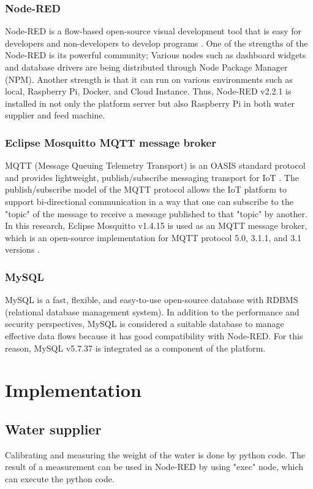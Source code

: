 ﻿\documentclass[conference]{IEEEtran}
\begin{document}
\subsubsection{Node-RED}
Node-RED is a flow-based open-source visual development tool that is easy for developers and non-developers to develop programs \cite{b12}.
One of the strengths of the Node-RED is its powerful community; Various nodes such as dashboard widgets and database drivers are being distributed through Node Package Manager (NPM).
Another strength is that it can run on various environments such as local, Raspberry Pi, Docker, and Cloud Instance.
Thus, Node-RED v2.2.1 is installed in not only the platform server but also Raspberry Pi in both water supplier and feed machine.

\subsubsection{Eclipse Mosquitto MQTT message broker}
MQTT (Message Queuing Telemetry Transport) is an OASIS standard protocol and provides lightweight, publish/subscribe messaging transport for IoT \cite{b8}.
The publish/subscribe model of the MQTT protocol allows the IoT platform to support bi-directional communication in a way that one can subscribe to the "topic" of the message to receive a message published to that "topic" by another.
In this research, Eclipse Mosquitto v1.4.15 is used as an MQTT message broker, which is an open-source implementation for MQTT protocol 5.0, 3.1.1, and 3.1 versions \cite{b13}.

\subsubsection{MySQL}
MySQL is a fast, flexible, and easy-to-use open-source database with RDBMS (relational database management system).
In addition to the performance and security perspectives, MySQL is considered a suitable database to manage effective data flows because it has good compatibility with Node-RED.
For this reason, MySQL v5.7.37 is integrated as a component of the platform.

\section{Implementation}
\subsection{Water supplier}
Calibrating and measuring the weight of the water is done by python code.
The result of a measurement can be used in Node-RED by using "exec" node, which can execute the python code.
\end{document}
